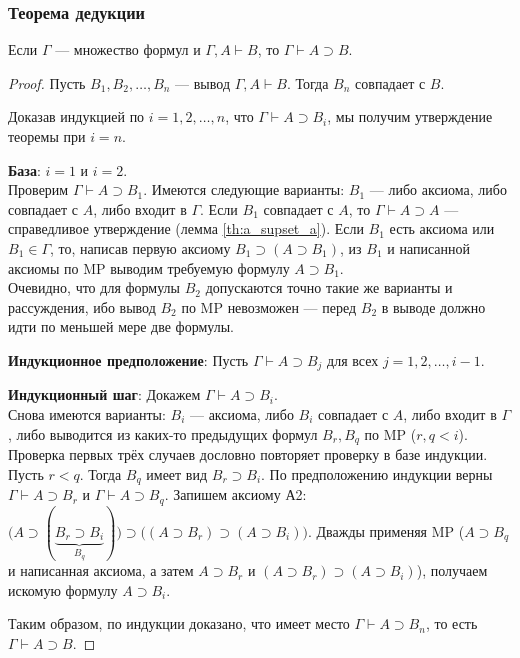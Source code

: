 \subsubsection{Теорема дедукции}
\nobreak\vspace{0.5em}
\nopagebreak
\begin{theorem}
    Если $\Gamma$ --- множество формул и $\Gamma, A \vdash B$, то $\Gamma \vdash A \supset B$.
\end{theorem}
\begin{proof}\leavevmode

    Пусть $B_1, B_2, \dots, B_n$ --- вывод $\Gamma, A \vdash B$. Тогда $B_n$ совпадает с $B$. 

    Доказав индукцией по $i = 1, 2, \dots, n$, что $\Gamma \vdash A \supset B_i$, мы получим утверждение теоремы при $i = n$.

    \textbf{База}: $i = 1$ и $i = 2$. \\
    Проверим $\Gamma \vdash A \supset B_1$. Имеются следующие варианты: $B_1$ --- либо аксиома, либо совпадает с $A$, либо входит в $\Gamma$. Если $B_1$ совпадает с $A$, то $\Gamma \vdash A \supset A$ --- справедливое утверждение (лемма \ref{th:a_supset_a}). Если $B_1$ есть аксиома или $B_1 \in \Gamma$, то, написав первую аксиому $B_1 \supset (A \supset B_1)$, из $B_1$ и написанной аксиомы по MP выводим требуемую формулу $A \supset B_1$. \\
    Очевидно, что для формулы $B_2$ допускаются точно такие же варианты и рассуждения, ибо вывод $B_2$ по MP невозможен --- перед $B_2$ в выводе должно идти по меньшей мере две формулы.

    \textbf{Индукционное предположение}: Пусть $\Gamma \vdash A \supset B_j$ для всех $j = 1, 2, \dots, i - 1$.
    
    \textbf{Индукционный шаг}: Докажем $\Gamma \vdash A \supset B_i$. \\
    Снова имеются варианты: $B_i$ --- аксиома, либо $B_i$ совпадает с $A$, либо входит в $\Gamma$, либо выводится из каких-то предыдущих формул $B_r, B_q$ по MP ($r, q < i$). Проверка первых трёх случаев дословно повторяет проверку в базе индукции. Пусть $r < q$. Тогда $B_q$ имеет вид $B_r \supset B_i$. По предположению индукции верны $\Gamma \vdash A \supset B_r$ и $\Gamma \vdash A \supset B_q$. Запишем аксиому А2: $\big(A \supset (\underbrace{B_r \supset B_i}_{B_q})\big) \supset \big((A \supset B_r) \supset (A \supset B_i)\big)$. Дважды применяя MP ($A \supset B_q$ и написанная аксиома, а затем $A \supset B_r$ и $(A \supset B_r) \supset (A \supset B_i)$), получаем искомую формулу $A \supset B_i$.

    Таким образом, по индукции доказано, что имеет место $\Gamma \vdash A \supset B_n$, то есть $\Gamma \vdash A \supset B$.
\end{proof}

